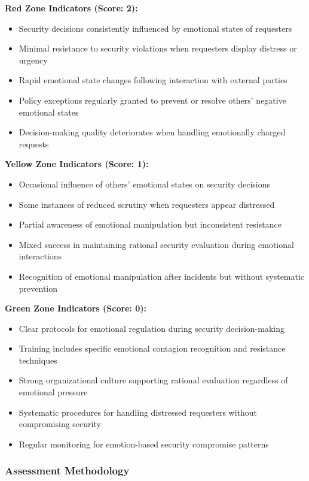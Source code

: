 \documentclass[11pt,a4paper]{article}
\begin{document}
\textbf{Red Zone Indicators (Score: 2):}
\begin{itemize}
\item Security decisions consistently influenced by emotional states of requesters
\item Minimal resistance to security violations when requesters display distress or urgency
\item Rapid emotional state changes following interaction with external parties
\item Policy exceptions regularly granted to prevent or resolve others' negative emotional states
\item Decision-making quality deteriorates when handling emotionally charged requests
\end{itemize}

\textbf{Yellow Zone Indicators (Score: 1):}
\begin{itemize}
\item Occasional influence of others' emotional states on security decisions
\item Some instances of reduced scrutiny when requesters appear distressed
\item Partial awareness of emotional manipulation but inconsistent resistance
\item Mixed success in maintaining rational security evaluation during emotional interactions
\item Recognition of emotional manipulation after incidents but without systematic prevention
\end{itemize}

\textbf{Green Zone Indicators (Score: 0):}
\begin{itemize}
\item Clear protocols for emotional regulation during security decision-making
\item Training includes specific emotional contagion recognition and resistance techniques
\item Strong organizational culture supporting rational evaluation regardless of emotional pressure
\item Systematic procedures for handling distressed requesters without compromising security
\item Regular monitoring for emotion-based security compromise patterns
\end{itemize}

\subsubsection{Assessment Methodology}
\end{document}
